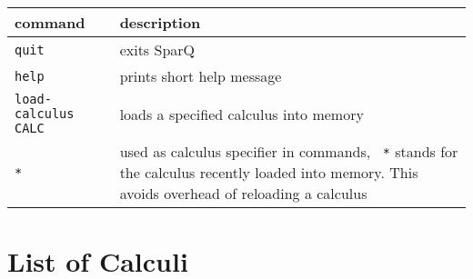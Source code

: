\documentclass[headsepline]{scrreprt}
\theoremstyle{definition}
\newcommand{\engine}{SparQ}
\begin{document}
\begin{longtable}{|lp{10cm}|}\hline
	\bfseries{command} & \bfseries{description} \\ \hline \hline
	\texttt{quit} & exits \engine{}\\
	\texttt{help} & prints short help message\\
	\texttt{load-calculus CALC} & loads a specified calculus into memory\\
	\texttt{*} & used as calculus specifier in commands, \texttt{ *} stands for the calculus recently loaded into memory. This avoids overhead of reloading a calculus\\ \hline
\end{longtable}

\section{List of Calculi}
\renewcommand{\arraystretch}{1.5}
\end{document}
